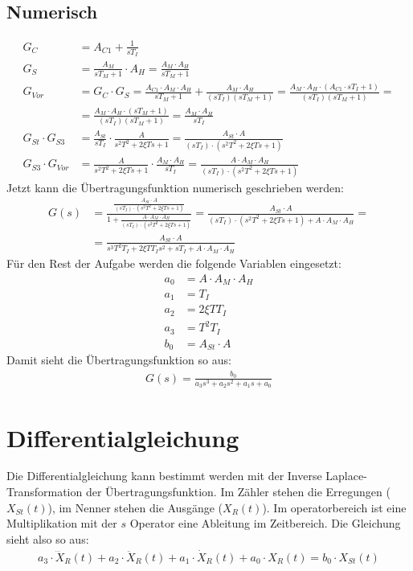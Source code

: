 \documentclass[fleqn,12pt]{article}
\begin{document}
\subsection{Numerisch}
\begin{align*}
  G_C &= A_{C1} + \frac{1}{sT_I}\\
  G_S &= \frac{A_M}{sT_M + 1} \cdot A_H = \frac{A_M \cdot A_H}{sT_M + 1} \\
  G_{Vor} &= G_C \cdot G_S = \frac{A_{C1} \cdot A_M \cdot A_H}{sT_M + 1} + \frac{A_M \cdot A_H}{(sT_I)(sT_M + 1)} =
  \frac{A_M \cdot A_H \cdot (A_{C1} \cdot sT_I + 1)}{(sT_I)(sT_M + 1)} =\\
  &= \frac{A_M \cdot A_H \cdot (sT_M + 1)}{(sT_I)(sT_M + 1)} = \frac{A_M \cdot A_H}{sT_I}\\
  G_{St} \cdot G_{S3} &= \frac{A_{St}}{sT_I} \cdot \frac{A}{s^2T^2 + 2\xi Ts + 1} = \frac{A_{St} \cdot A}{(sT_I) \cdot (s^2T^2 + 2\xi Ts + 1)} \\
  G_{S3} \cdot G_{Vor} &= \frac{A}{s^2T^2+2\xi Ts + 1} \cdot \frac{A_M \cdot A_H}{sT_I} = \frac{A \cdot A_M \cdot A_H}{(sT_I)\cdot(s^2T^2+2\xi Ts + 1)}
\end{align*}
Jetzt kann die Übertragungsfunktion numerisch geschrieben werden:
\begin{align*}
  G(s) &= \frac{\frac{A_{St} \cdot A}{(sT_I) \cdot (s^2T^2 + 2\xi Ts + 1)}}{1 + \frac{A \cdot A_M \cdot A_H}{(sT_I)\cdot(s^2T^2+2\xi Ts + 1)}} =
  \frac{A_{St} \cdot A}{(sT_I) \cdot (s^2T^2 + 2\xi Ts + 1) + A \cdot A_M \cdot A_H} = \\
  &=
  \boxed{
    \frac{A_{St} \cdot A}{s^3T^2T_I + 2\xi T T_I s^2 + sT_I + A \cdot A_M \cdot A_H}
  }
\end{align*}
Für den Rest der Aufgabe werden die folgende Variablen eingesetzt:
\begin{align*}
  a_0 &= A \cdot A_M \cdot A_H \\
  a_1 &= T_I \\
  a_2 &= 2 \xi TT_I \\
  a_3 &= T^2T_I \\
  b_0 &= A_{St} \cdot A
\end{align*}
Damit sieht die Übertragungsfunktion so aus:
\begin{align*}
  G(s) = \frac{b_0}{a_3s^3 + a_2s^2 + a_1s + a_0}
\end{align*}

\section{Differentialgleichung}
Die Differentialgleichung kann bestimmt werden mit der Inverse Laplace-Transformation der Übertragungsfunktion. Im Zähler stehen die Erregungen ($X_{St}(t)$), im Nenner stehen die Ausgänge ($X_{R}(t)$). Im operatorbereich ist eine Multiplikation mit der $s$ Operator eine Ableitung im Zeitbereich. Die Gleichung sieht also so aus:
\begin{align*}
  a_3 \cdot \dddot{X}_R(t) + a_2 \cdot \ddot{X}_R(t) + a_1 \cdot \dot{X}_R(t) + a_0 \cdot X_R(t) = b_0 \cdot X_{St}(t)
\end{align*}
\end{document}
